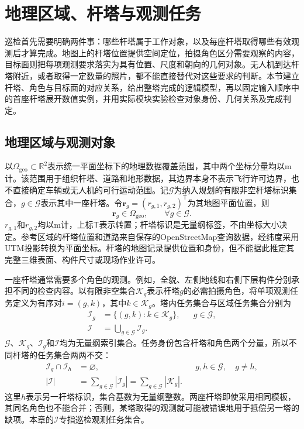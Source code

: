 \section{地理区域、杆塔与观测任务}
\label{sec:04_01}

巡检首先需要明确两件事：哪些杆塔属于工作对象，以及每座杆塔取得哪些有效观测后才算完成。地图上的杆塔位置提供空间定位，拍摄角色区分需要观察的内容，目标面则把每项观测要求落实为具有位置、尺度和朝向的几何对象。无人机到达杆塔附近，或者取得一定数量的照片，都不能直接替代对这些要求的判断。本节建立杆塔、角色与目标面的对应关系，给出整塔完成的逻辑模型，再以固定输入顺序中的首座杆塔展开数值实例，并用实际模块实验检查对象身份、几何关系及完成判定。

\subsection{地理区域与观测对象}

以$\Omega_{\mathrm{geo}}\subset\mathbb R^2$表示统一平面坐标下的地理数据覆盖范围，其中两个坐标分量均以$\mathrm m$计。该范围用于组织杆塔、道路和地形数据，其边界本身不表示飞行许可边界，也不直接确定车辆或无人机的可行运动范围。记$\mathcal G$为纳入规划的有限非空杆塔标识集合，$g\in\mathcal G$表示其中一座杆塔。令$\mathbf r_g=(r_{g,1},r_{g,2})^{\mathsf T}$为其地图平面位置，则
\begin{equation}
 \mathbf r_g\in\Omega_{\mathrm{geo}},
 \qquad \forall g\in\mathcal G.
 \label{s0401:tower_locations}
\end{equation}
$r_{g,1}$和$r_{g,2}$均以$\mathrm m$计，上标$\mathsf T$表示转置；杆塔标识是无量纲标签，不由坐标大小决定。参考区域的杆塔位置和道路来自保存的OpenStreetMap查询数据\cite{OSMData}，经纬度采用UTM投影转换为平面坐标\cite{PROJUTM}。杆塔的地图记录提供位置和身份，但不能据此推定其完整三维表面、构件尺寸或现场作业许可。

一座杆塔通常需要多个角色的观测。例如，全貌、左侧地线和右侧下层构件分别承担不同的检查内容。以有限非空集合$\mathcal K_g$表示杆塔$g$的必需拍摄角色，将单项观测任务定义为有序对$i=(g,k)$，其中$k\in\mathcal K_g$。塔内任务集合与区域任务集合分别为
\begin{align}
 \mathcal I_g&=\{(g,k):k\in\mathcal K_g\},
 &&g\in\mathcal G,
 \label{s0401:tower_tasks}\\
 \mathcal I&=\bigcup_{g\in\mathcal G}\mathcal I_g.
 \label{s0401:regional_tasks}
\end{align}
$\mathcal G$、$\mathcal K_g$、$\mathcal I_g$和$\mathcal I$均为无量纲索引集合。任务身份包含杆塔和角色两个分量，所以不同杆塔的任务集合两两不交：
\begin{align}
 \mathcal I_g\cap\mathcal I_h&=\varnothing,
 &&g,h\in\mathcal G,\quad g\ne h,
 \label{s0401:disjoint_tasks}\\
 |\mathcal I|&=\sum_{g\in\mathcal G}|\mathcal I_g|
 =\sum_{g\in\mathcal G}|\mathcal K_g|.
 \label{s0401:task_count}
\end{align}
这里$h$表示另一杆塔标识，集合基数为无量纲整数。两座杆塔即使采用相同模板，其同名角色也不能合并；否则，某塔取得的观测就可能被错误地用于抵偿另一塔的缺项。本章的$\mathcal I$专指巡检观测任务集合。

